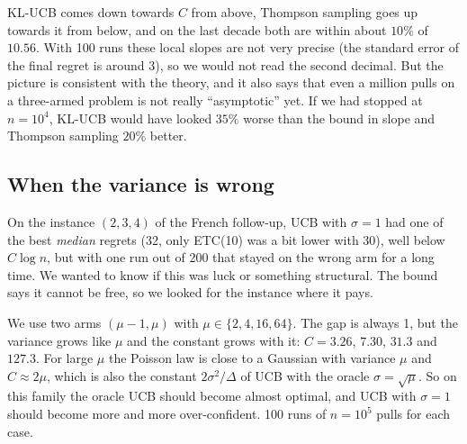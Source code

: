 KL-UCB comes down towards $C$ from above, Thompson sampling goes up towards it from below, and on the last decade both are within about $10\%$ of $10.56$. With 100 runs these local slopes are not very precise (the standard error of the final regret is around 3), so we would not read the second decimal. But the picture is consistent with the theory, and it also says that even a million pulls on a three-armed problem is not really ``asymptotic'' yet. If we had stopped at $n = 10^4$, KL-UCB would have looked $35\%$ worse than the bound in slope and Thompson sampling $20\%$ better.

\subsection{When the variance is wrong}

On the instance $(2, 3, 4)$ of the French follow-up, UCB with $\sigma = 1$ had one of the best \emph{median} regrets (32, only ETC(10) was a bit lower with 30), well below $C \log n$, but with one run out of 200 that stayed on the wrong arm for a long time. We wanted to know if this was luck or something structural. The bound says it cannot be free, so we looked for the instance where it pays.

We use two arms $(\mu - 1, \mu)$ with $\mu \in \{2, 4, 16, 64\}$. The gap is always 1, but the variance grows like $\mu$ and the constant grows with it: $C = 3.26$, $7.30$, $31.3$ and $127.3$. For large $\mu$ the Poisson law is close to a Gaussian with variance $\mu$ and $C \approx 2\mu$, which is also the constant $2\sigma^2/\Delta$ of UCB with the oracle $\sigma = \sqrt{\mu}$. So on this family the oracle UCB should become almost optimal, and UCB with $\sigma = 1$ should become more and more over-confident. 100 runs of $n = 10^5$ pulls for each case.

